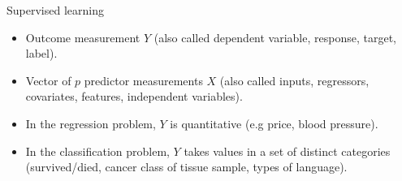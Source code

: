 \documentclass[aspectratio=169,usenames,dvipsnames]{beamer}
\begin{document}
\begin{frame}[c]{Supervised learning}

\begin{itemize}
	\item Outcome measurement $Y$ (also called dependent variable, response, target, label).

\item
Vector of $p$ predictor measurements $X$ (also called inputs, regressors, covariates, features, independent variables).

\item
In the regression problem, $Y$ is quantitative (e.g price, blood pressure).

\item
In the classification problem, $Y$ takes values in a set of distinct categories (survived/died, cancer class of tissue sample, types of language).
\end{itemize}
\begin{columns}
\centering

\centering

\end{columns}

\end{frame}
\end{document}
